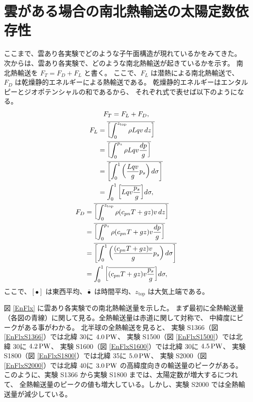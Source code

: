 \documentclass[body]{subfiles}
\begin{document}
\afterpage{\clearpage}

\section{雲がある場合の南北熱輸送の太陽定数依存性}

ここまで、雲あり各実験でどのような子午面構造が現れているかをみてきた。
次からは、雲あり各実験で、どのような南北熱輸送が起きているかを示す。
南北熱輸送を \(F_T=F_D+F_L\) と書く。
ここで、\(F_L\) は潜熱による南北熱輸送で、
\(F_D\) は乾燥静的エネルギーによる熱輸送である。
乾燥静的エネルギーはエンタルピーとジオポテンシャルの和であるから、
それぞれ式で表せば以下のようになる。
\begin{gather}
	F_T=F_L+F_D,\\
	\begin{split}
		F_L&=\overline{\qty[\int^{z_\text{top}}_0 \rho Lqv\,dz]}\\
		&=\overline{\qty[\int^{p_s}_0 \rho Lqv\frac{dp}{g}]}\\
		&=\overline{\qty[\int^1_0 \qty(\frac{Lqv}{g}p_s)\,d\sigma]}\\
		&=\int^1_0 \qty[\overline{Lqv\frac{p_s}{g}}]d\sigma,
	\end{split}\\
	\begin{split}
		F_D&=\overline{\qty[\int^{z_\text{top}}_0 \rho (c_{pn}T+gz)v\,dz]}\\
		&=\overline{\qty[\int^{p_s}_0 \rho (c_{pn}T+gz)v\frac{dp}{g}]}\\
		&=\overline{\qty[\int^1_0 \qty(\frac{(c_{pn}T+gz)v}{g}p_s)\,d\sigma]}\\
		&=\int^1_0 \qty[\overline{(c_{pn}T+gz)v\frac{p_s}{g}}]d\sigma,
	\end{split}
\end{gather}
ここで、\([\bullet]\) は東西平均、\(\bar\bullet\) は時間平均、\(z_\text{top}\) は大気上端である。

\afterpage{\clearpage}

図 \ref{EnFlx} に雲あり各実験での南北熱輸送量を示した。
まず最初に全熱輸送量（各図の青線）に関して見る。全熱輸送量は赤道に関して対称で、
中緯度にピークがある事がわかる。
北半球の全熱輸送を見ると、
実験 S1366（図 \ref{EnFlxS1366}）では北緯 30\textdegree に \(4.0\hmu{PW}\)、
実験 S1500（図 \ref{EnFlxS1500}）では北緯 30\textdegree に \(4.2\hmu{PW}\)、
実験 S1600（図 \ref{EnFlxS1600}）では北緯 30\textdegree に \(4.5\hmu{PW}\)、
実験 S1800（図 \ref{EnFlxS1800}）では北緯 35\textdegree に \(5.0\hmu{PW}\)、
実験 S2000（図 \ref{EnFlxS2000}）では北緯 40\textdegree に \(3.0\hmu{PW}\)
の高緯度向きの輸送量のピークがある。
このように、実験 S1366 から実験 S1800 までは、太陽定数が増大するにつれて、
全熱輸送量のピークの値も増大している。しかし、実験 S2000 では全熱輸送量が減少している。
\end{document}

